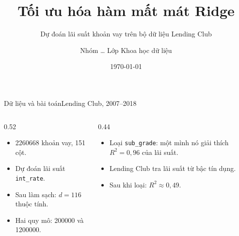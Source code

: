 \documentclass[11pt, aspectratio=169]{beamer}
\title[Tối ưu hóa hàm mất mát Ridge]{Tối ưu hóa hàm mất mát Ridge}
\subtitle{Dự đoán lãi suất khoản vay trên bộ dữ liệu Lending Club}
\author{Nhóm \dots{} \textbullet{} Lớp Khoa học dữ liệu}
\date{\today}
\begin{document}

\begin{frame}[plain]
  \vspace{1.2em}
  {\color{ink}\inserttitle\par}
  \vspace{0.4em}{\color{accent}\rule{0.5\textwidth}{1.2pt}\par}
  \vspace{0.6em}
  {\sffamily\large\color{rule}\insertsubtitle\par}
  \vfill
  {\insertauthor\par}
  {\color{rule}\insertdate\par}
\end{frame}

\begin{frame}{Dữ liệu và bài toán}{Lending Club, 2007--2018}
  \begin{columns}[T]
    \begin{column}{0.52\textwidth}
      \begin{itemize}
        \item \num{2260668} khoản vay, 151 cột.
        \item Dự đoán lãi suất \texttt{int\_rate}.
        \item Sau làm sạch: $d = 116$ thuộc tính.
        \item Hai quy mô: \num{200000} và \num{1200000}.
      \end{itemize}
    \end{column}
    \begin{column}{0.44\textwidth}
      \begin{itemize}
        \item Loại \texttt{sub\_grade}: một mình nó giải thích $R^2 = 0{,}96$ của lãi suất.
        \item Lending Club tra lãi suất từ bậc tín dụng.
        \item Sau khi loại: $R^2 \approx 0{,}49$.
      \end{itemize}
    \end{column}
  \end{columns}
\end{frame}
\end{document}
